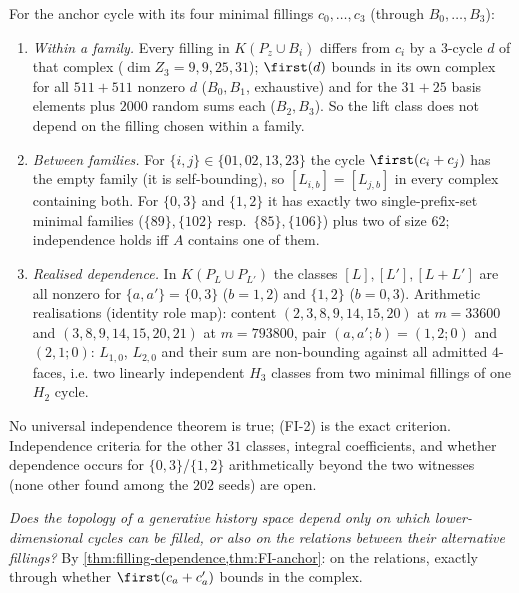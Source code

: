 \begin{theorem}\label{thm:FI-anchor}
For the anchor cycle with its four minimal fillings $c_0,\dots,c_3$ (through $B_0,\dots,B_3$):
\begin{enumerate}[label=(\roman*)]
\item \emph{Within a family.} Every filling in $K(P_z\cup B_i)$ differs from $c_i$ by a $3$-cycle $d$ of that complex ($\dim Z_3=9,9,25,31$); $\first(d)$ bounds in its own complex for all $511+511$ nonzero $d$ ($B_0,B_1$, exhaustive) and for the $31+25$ basis elements plus $2000$ random sums each ($B_2,B_3$). So the lift class does not depend on the filling chosen within a family.
\item \emph{Between families.} For $\{i,j\}\in\{01,02,13,23\}$ the cycle $\first(c_i+c_j)$ has the empty family (it is self-bounding), so $[L_{i,b}]=[L_{j,b}]$ in every complex containing both. For $\{0,3\}$ and $\{1,2\}$ it has exactly two single-prefix-set minimal families ($\{89\},\{102\}$ resp.\ $\{85\},\{106\}$) plus two of size $62$; independence holds iff $A$ contains one of them.
\item \emph{Realised dependence.} In $K(P_L\cup P_{L'})$ the classes $[L],[L'],[L+L']$ are all nonzero for $\{a,a'\}=\{0,3\}$ ($b=1,2$) and $\{1,2\}$ ($b=0,3$). Arithmetic realisations (identity role map): content $(2,3,8,9,14,15,20)$ at $m=33600$ and $(3,8,9,14,15,20,21)$ at $m=793800$, pair $(a,a';b)=(1,2;0)$ and $(2,1;0)$: $L_{1,0}$, $L_{2,0}$ and their sum are non-bounding against all admitted $4$-faces, i.e. two linearly independent $H_3$ classes from two minimal fillings of one $H_2$ cycle.
\end{enumerate}
No universal independence theorem is true; (FI-2) is the exact criterion. Independence criteria for the other $31$ classes, integral coefficients, and whether dependence occurs for $\{0,3\}$/$\{1,2\}$ arithmetically beyond the two witnesses (none other found among the $202$ seeds) are open.
\end{theorem}
\begin{remark}
\emph{Does the topology of a generative history space depend only on which lower-dimensional cycles can be filled, or also on the relations between their alternative fillings?} By \cref{thm:filling-dependence,thm:FI-anchor}: on the relations, exactly through whether $\first(c_a+c_a')$ bounds in the complex.
\end{remark}

